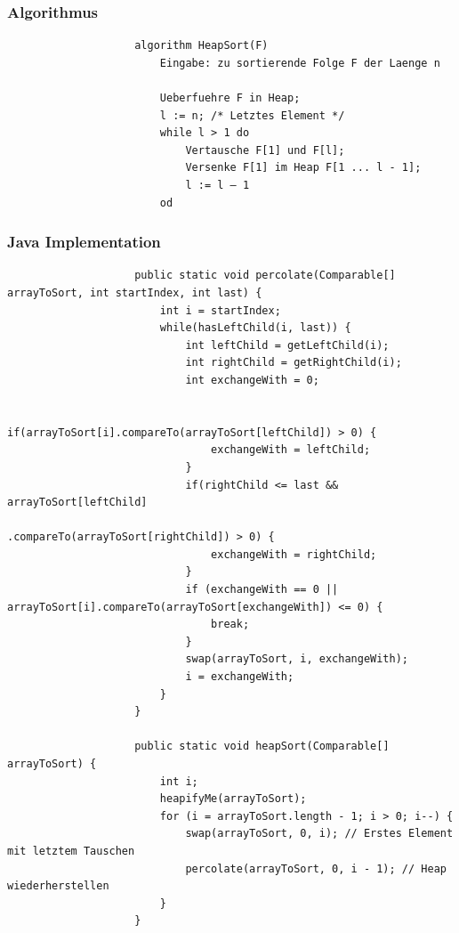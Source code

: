 \documentclass[a4paper, landscape, 8pt]{scrartcl}
\begin{document}
\begin{multicols*}{4}
                \subsubsection{Algorithmus}
                \begin{lstlisting}
                    algorithm HeapSort(F)
                        Eingabe: zu sortierende Folge F der Laenge n

                        Ueberfuehre F in Heap;
                        l := n; /* Letztes Element */
                        while l > 1 do
                            Vertausche F[1] und F[l];
                            Versenke F[1] im Heap F[1 ... l - 1];
                            l := l – 1
                        od
                \end{lstlisting}
                \subsubsection{Java Implementation}
                \begin{lstlisting}
                    public static void percolate(Comparable[] arrayToSort, int startIndex, int last) {
                        int i = startIndex;
                        while(hasLeftChild(i, last)) {
                            int leftChild = getLeftChild(i);
                            int rightChild = getRightChild(i);
                            int exchangeWith = 0;

                            if(arrayToSort[i].compareTo(arrayToSort[leftChild]) > 0) {
                                exchangeWith = leftChild;
                            }
                            if(rightChild <= last && arrayToSort[leftChild]
                                    .compareTo(arrayToSort[rightChild]) > 0) {
                                exchangeWith = rightChild;
                            }
                            if (exchangeWith == 0 || arrayToSort[i].compareTo(arrayToSort[exchangeWith]) <= 0) {
                                break;
                            }
                            swap(arrayToSort, i, exchangeWith);
                            i = exchangeWith;
                        }
                    }

                    public static void heapSort(Comparable[] arrayToSort) {
                        int i;
                        heapifyMe(arrayToSort);
                        for (i = arrayToSort.length - 1; i > 0; i--) {
                            swap(arrayToSort, 0, i); // Erstes Element mit letztem Tauschen
                            percolate(arrayToSort, 0, i - 1); // Heap wiederherstellen
                        }
                    }
                \end{lstlisting}


\end{multicols*}
\end{document}
